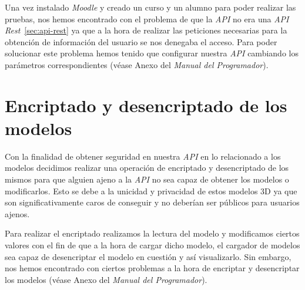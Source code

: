 Una vez instalado \textit{Moodle} y creado un curso y un alumno para poder realizar las pruebas, nos hemos encontrado con el problema de que la \textit{API} no era una \textit{API Rest}~\ref{sec:api-rest} ya que a la hora de realizar las peticiones necesarias para la obtención de información del usuario se nos denegaba el acceso. Para poder solucionar este problema hemos tenido que configurar nuestra \textit{API} cambiando los parámetros correspondientes (véase Anexo del \textit{Manual del Programador}).

\section{Encriptado y desencriptado de los modelos}
Con la finalidad de obtener seguridad en nuestra \textit{API} en lo relacionado a los modelos decidimos realizar una operación de encriptado y desencriptado de los mismos para que alguien ajeno a la \textit{API} no sea capaz de obtener los modelos o modificarlos. Esto se debe a la unicidad y privacidad de estos modelos 3D ya que son significativamente caros de conseguir y no deberían ser públicos para usuarios ajenos.

Para realizar el encriptado realizamos la lectura del modelo y modificamos ciertos valores con el fin de que a la hora de cargar dicho modelo, el cargador de modelos sea capaz de desencriptar el modelo en cuestión y así visualizarlo. Sin embargo, nos hemos encontrado con ciertos problemas a la hora de encriptar y desencriptar los modelos (véase Anexo del \textit{Manual del Programador}).
